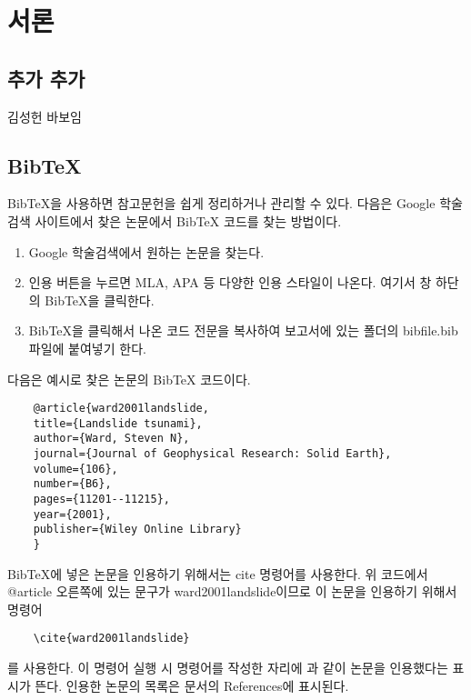 \section{서론}

\subsection{추가 추가}

김성헌 바보임

\subsection{BibTeX}

BibTeX을 사용하면 참고문헌을 쉽게 정리하거나 관리할 수 있다. 다음은 Google 학술검색 사이트에서 찾은 논문에서 BibTeX 코드를 찾는 방법이다.

\begin{enumerate}
	\item Google 학술검색에서 원하는 논문을 찾는다.
	\item 인용 버튼을 누르면 MLA, APA 등 다양한 인용 스타일이 나온다. 여기서 창 하단의 BibTeX을 클릭한다.
	\item BibTeX을 클릭해서 나온 코드 전문을 복사하여 보고서에 있는 폴더의 bibfile.bib 파일에 붙여넣기 한다.
\end{enumerate}

다음은 예시로 찾은 논문의 BibTeX 코드이다.
\begin{lstlisting}
	@article{ward2001landslide,
	title={Landslide tsunami},
	author={Ward, Steven N},
	journal={Journal of Geophysical Research: Solid Earth},
	volume={106},
	number={B6},
	pages={11201--11215},
	year={2001},
	publisher={Wiley Online Library}
	}
\end{lstlisting}

BibTeX에 넣은 논문을 인용하기 위해서는 cite 명령어를 사용한다. 위 코드에서 @article 오른쪽에 있는 문구가 ward2001landslide이므로 이 논문을 인용하기 위해서 명령어
\begin{lstlisting}
	\cite{ward2001landslide}
\end{lstlisting}
를 사용한다. 이 명령어 실행 시 명령어를 작성한 자리에 \cite{ward2001landslide}과 같이 논문을 인용했다는 표시가 뜬다. 인용한 논문의 목록은 문서의 References에 표시된다.